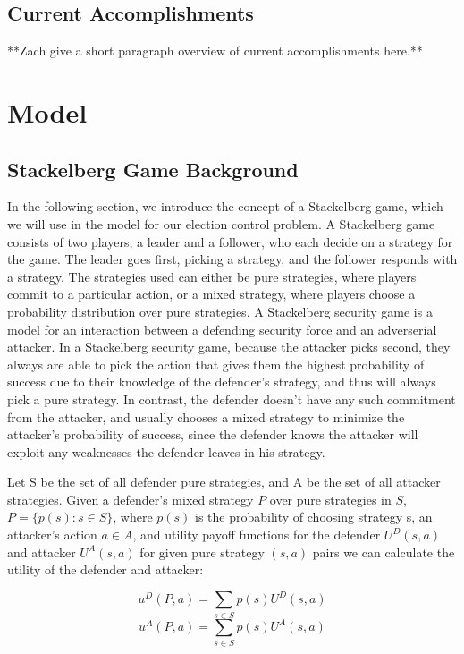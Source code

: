 \documentclass[letterpaper]{article} %
\begin{document}
\subsection{Current Accomplishments}
**Zach give a short paragraph overview of current accomplishments here.**

\section{Model}
\subsection{Stackelberg Game Background}
In the following section, we introduce the concept of a Stackelberg game, which we will use in the model for our election control problem. A Stackelberg game consists of two players, a leader and a follower, who each decide on a strategy for the game. The leader goes first, picking a strategy, and the follower responds with a strategy. The strategies used can either be pure strategies, where players commit to a particular action, or a mixed strategy, where players choose a probability distribution over pure strategies. A Stackelberg security game is a model for an interaction between a defending security force and an adverserial attacker. In a Stackelberg security game, because the attacker picks second, they always are able to pick the action that gives them the highest probability of success due to their knowledge of the defender's strategy, and thus will always pick a pure strategy. In contrast, the defender doesn't have any such commitment from the attacker, and usually chooses a mixed strategy to minimize the attacker's probability of success, since the defender knows the attacker will exploit any weaknesses the defender leaves in his strategy. 

Let S be the set of all defender pure strategies, and A be the set of all attacker strategies. Given a defender's mixed strategy $P$ over pure strategies in $S$, $P = \{p(s) : s \in S\}$, where $p(s)$ is the probability of choosing strategy s, an attacker's action $a \in A$, and utility payoff functions for the defender $U^D(s,a)$ and attacker $U^A(s,a)$ for given pure strategy $(s,a)$ pairs we can calculate the utility of the defender and attacker:

\begin{equation}
u^D(P,a) = \sum_{s \in S}p(s)U^D(s,a)
\end{equation}
\begin{equation}
u^A(P,a) = \sum_{s \in S}p(s)U^A(s,a)
\end{equation}
\end{document}
